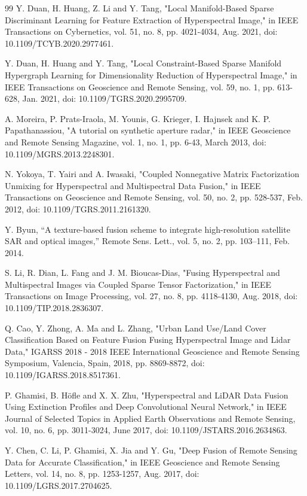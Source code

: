 \documentclass[UTF8,zihao=-4]{oucart}
\begin{document}
\begin{thebibliography}{99}
    Y. Duan, H. Huang, Z. Li and Y. Tang, "Local Manifold-Based Sparse Discriminant Learning for Feature Extraction of Hyperspectral Image," in IEEE Transactions on Cybernetics, vol. 51, no. 8, pp. 4021-4034, Aug. 2021, doi: 10.1109/TCYB.2020.2977461.

    Y. Duan, H. Huang and Y. Tang, "Local Constraint-Based Sparse Manifold Hypergraph Learning for Dimensionality Reduction of Hyperspectral Image," in IEEE Transactions on Geoscience and Remote Sensing, vol. 59, no. 1, pp. 613-628, Jan. 2021, doi: 10.1109/TGRS.2020.2995709.

    A. Moreira, P. Prats-Iraola, M. Younis, G. Krieger, I. Hajnsek and K. P. Papathanassiou, "A tutorial on synthetic aperture radar," in IEEE Geoscience and Remote Sensing Magazine, vol. 1, no. 1, pp. 6-43, March 2013, doi: 10.1109/MGRS.2013.2248301.

    N. Yokoya, T. Yairi and A. Iwasaki, "Coupled Nonnegative Matrix Factorization Unmixing for Hyperspectral and Multispectral Data Fusion," in IEEE Transactions on Geoscience and Remote Sensing, vol. 50, no. 2, pp. 528-537, Feb. 2012, doi: 10.1109/TGRS.2011.2161320.

    Y. Byun, “A texture-based fusion scheme to integrate high-resolution satellite SAR and optical images,” Remote Sens. Lett., vol. 5, no. 2, pp. 103–111, Feb. 2014.

    S. Li, R. Dian, L. Fang and J. M. Bioucas-Dias, "Fusing Hyperspectral and Multispectral Images via Coupled Sparse Tensor Factorization," in IEEE Transactions on Image Processing, vol. 27, no. 8, pp. 4118-4130, Aug. 2018, doi: 10.1109/TIP.2018.2836307.

    Q. Cao, Y. Zhong, A. Ma and L. Zhang, "Urban Land Use/Land Cover Classification Based on Feature Fusion Fusing Hyperspectral Image and Lidar Data," IGARSS 2018 - 2018 IEEE International Geoscience and Remote Sensing Symposium, Valencia, Spain, 2018, pp. 8869-8872, doi: 10.1109/IGARSS.2018.8517361.

    P. Ghamisi, B. Höfle and X. X. Zhu, "Hyperspectral and LiDAR Data Fusion Using Extinction Profiles and Deep Convolutional Neural Network," in IEEE Journal of Selected Topics in Applied Earth Observations and Remote Sensing, vol. 10, no. 6, pp. 3011-3024, June 2017, doi: 10.1109/JSTARS.2016.2634863.

    Y. Chen, C. Li, P. Ghamisi, X. Jia and Y. Gu, "Deep Fusion of Remote Sensing Data for Accurate Classification," in IEEE Geoscience and Remote Sensing Letters, vol. 14, no. 8, pp. 1253-1257, Aug. 2017, doi: 10.1109/LGRS.2017.2704625.


\end{thebibliography}
\end{document}
